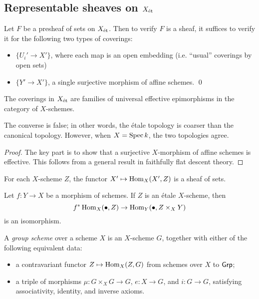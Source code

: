 \documentclass[11pt]{amsart}
\begin{document}
\subsection{Representable sheaves on $X_{\operatorname{\acute{e}t}}$}

\begin{prop}
    Let $F$ be a presheaf of sets on $X_{\operatorname{\acute{e}t}}$. Then to verify $F$ is a sheaf, it suffices to verify it for the following two types of coverings:
    \begin{itemize}
        \item $\{U_i'\to X'\}$, where each map is an open embedding (i.e. ``usual'' coverings by open sets)
        \item $\{Y'\to X'\}$, a single surjective morphism of affine schemes. \qed
    \end{itemize}
\end{prop}

\begin{thm}
    The coverings in $X_{\operatorname{\acute{e}t}}$ are families of universal effective epimorphisms in the category of $X$-schemes.
\end{thm}

The converse is false; in other words, the \'etale topology is coarser than the canonical topology. However, when $X = \operatorname{Spec} k$, the two topologies agree.

\begin{proof}
    The key part is to show that a surjective $X$-morphism of affine schemes is effective. This follows from a general result in faithfully flat descent theory. 
\end{proof}



\begin{cor}
    For each $X$-scheme $Z$, the functor $X'\mapsto \operatorname{Hom}_X(X',Z)$ is a sheaf of sets.
\end{cor}

\begin{prop}
    Let $f:Y\to X$ be a morphism of schemes. If $Z$ is an \'etale $X$-scheme, then
    \[f^\ast\operatorname{Hom}_X(\bullet, Z) \to \operatorname{Hom}_Y(\bullet, Z\times_X Y)\]
    is an isomorphism.
\end{prop}

\begin{defn}
    A \emph{group scheme} over a scheme $X$ is an $X$-scheme $G$, together with either of the following equivalent data:
    \begin{itemize}
        \item a contravariant functor $Z\mapsto \operatorname{Hom}_X(Z, G)$ from schemes over $X$ to $\mathsf{Grp}$;
        \item a triple of morphisms $\mu:G\times_X G\to G$, $e: X\to G$, and $i:G\to G$, satisfying associativity, identity, and inverse axioms.
    \end{itemize}
\end{defn}
\end{document}
